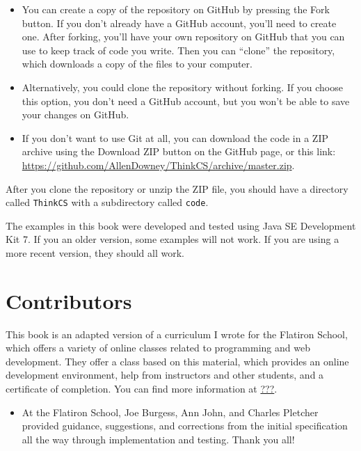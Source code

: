\documentclass[12pt]{book}
\theoremstyle{exercise}
\begin{document}
\begin{itemize}

\item You can create a copy of the repository on GitHub by pressing
  the {\sf Fork} button.  If you don't already have a GitHub account,
  you'll need to create one.  After forking, you'll have your own
  repository on GitHub that you can use to keep track of code you
  write.  Then you can ``clone'' the repository, which downloads a
  copy of the files to your computer.

\item Alternatively, you could clone the repository without forking.
  If you choose this option, you don't need a GitHub account, but you
  won't be able to save your changes on GitHub.

\item If you don't want to use Git at all, you can download the code
  in a ZIP archive using the {\sf Download ZIP} button on the GitHub
  page, or this link:
  \url{https://github.com/AllenDowney/ThinkCS/archive/master.zip}.


\end{itemize}

After you clone the repository or unzip the ZIP file, you should have
a directory called {\tt ThinkCS} with a subdirectory called {\tt code}.

The examples in this book were developed and tested using Java SE
Development Kit 7.  If you an older version, some examples will not
work.  If you are using a more recent version, they should all work.


\section*{Contributors}

This book is an adapted version of a curriculum I wrote for the
Flatiron School, which offers a variety of online classes related
to programming and web development.  They offer a class based
on this material, which provides an online development environment,
help from instructors and other students, and a certificate of
completion.  You can find more information at \url{???}.


\begin{itemize}


\item At the Flatiron School, Joe Burgess, Ann John, and Charles
Pletcher provided guidance, suggestions, and corrections from the
initial specification all the way through implementation and testing.
Thank you all!


\end{itemize}
\end{document}
